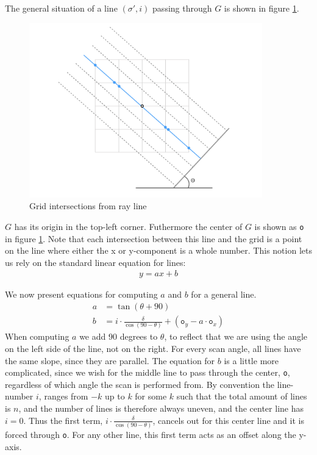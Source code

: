 The general situation of a line $(\sigma', i)$ passing through $G$ is shown in figure \ref{fig:intersections}.
\begin{figure}[H]
  \centering
  \includegraphics[width=0.9\textwidth]{figures/intersections.png}
  \caption{Grid intersections from ray line}
  \label{fig:intersections}
\end{figure}
$G$ has its origin in the top-left corner. Futhermore the center of $G$ is shown as \texttt{o} in figure \ref{fig:intersections}. Note that each intersection between this line and the grid is a point on the line where either the x or y-component is a whole number. This notion lets us rely on the standard linear equation for lines:
\begin{align}\label{line}
    y = ax + b
\end{align}

We now present equations for computing $a$ and $b$ for a general line. 
\begin{align}
  \label{eq:slope} a &= \tan (\theta + 90) \\[8pt]
  \label{eq:y_intersection} b &= i \cdot \frac{\delta}{\cos (90 - \theta)} + (\texttt{o}_y - a \cdot \texttt{o}_x)
\end{align}
When computing $a$ we add $90$ degrees to $\theta$, to reflect that we are using the angle on the left side of the line, not on the right. For every scan angle, all lines have the same slope, since they are parallel.
The equation for $b$ is a little more complicated, since we wish for the middle line to pass through the center, \texttt{o}, regardless of which angle the scan is performed from. By convention the line-number $i$, ranges from $-k$ up to $k$ for some $k$ such that the total amount of lines is $n$, and the number of lines is therefore always uneven, and the center line has $i=0$. Thus the first term, $i \cdot \frac{\delta}{\cos (90 - \theta)}$, cancels out for this center line and it is forced through \texttt{o}. For any other line, this first term acts as an offset along the y-axis.

